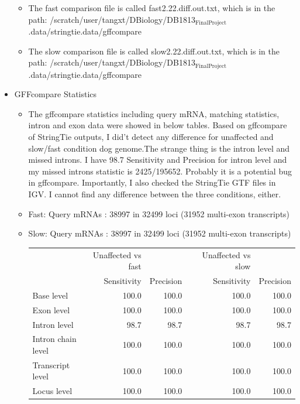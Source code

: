 \documentclass[11pt]{article}
\begin{document}
\begin{itemize}
\begin{itemize}
\item The fast comparison file is called fast2.22.diff.out.txt, which is in the path:
       /scratch/user/tangxt/DBiology/DB1813$_{\mathrm{FinalProject}}$.data/stringtie.data/gffcompare
\item The slow comparison file is called slow2.22.diff.out.txt, which is in the path:
       /scratch/user/tangxt/DBiology/DB1813$_{\mathrm{FinalProject}}$.data/stringtie.data/gffcompare
\end{itemize}

\item GFFcompare Statistics

\begin{itemize}
\item The gffcompare statistics including query mRNA, matching statistics, intron and exon data were showed in below tables. Based on gffcompare of StringTie 
      outputs, I did't detect any difference for unaffected and slow/fast condition dog genome.The strange thing is the intron level and missed introns. I have
      98.7 Sensitivity and Precision for intron level and my missed introns statistic is 2425/195652. Probably it is a potential bug in gffcompare. Importantly,
      I also checked the StringTie GTF files in IGV. I cannot find any difference between the three conditions, either.
\item Fast:    Query mRNAs :     38997 in     32499 loci  (31952 multi-exon transcripts)
\item Slow:    Query mRNAs :     38997 in     32499 loci  (31952 multi-exon transcripts)


\begin{center}
\begin{tabular}{lrrlrr}
                     &  Unaffected vs fast  &             &     &  Unaffected vs slow  &             \\
                     &         Sensitivity  &  Precision  &     &         Sensitivity  &  Precision  \\
 Base level          &               100.0  &      100.0  &     &               100.0  &      100.0  \\
 Exon level          &               100.0  &      100.0  &     &               100.0  &      100.0  \\
 Intron level        &                98.7  &       98.7  &     &                98.7  &       98.7  \\
 Intron chain level  &               100.0  &      100.0  &     &               100.0  &      100.0  \\
 Transcript level    &               100.0  &      100.0  &     &               100.0  &      100.0  \\
 Locus level         &               100.0  &      100.0  &     &               100.0  &      100.0  \\
\end{tabular}
\end{center}



\end{itemize}
\end{itemize}
\end{document}
